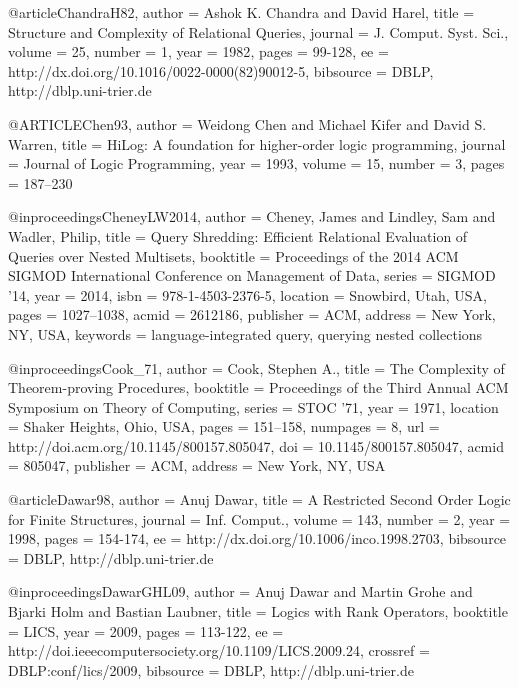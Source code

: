 \documentclass{article}
\begin{document}
@article{ChandraH82,
  author    = {Ashok K. Chandra and
               David Harel},
  title     = {Structure and Complexity of Relational Queries},
  journal   = {J. Comput. Syst. Sci.},
  volume    = {25},
  number    = {1},
  year      = {1982},
  pages     = {99-128},
  ee        = {http://dx.doi.org/10.1016/0022-0000(82)90012-5},
  bibsource = {DBLP, http://dblp.uni-trier.de}
}

@ARTICLE{Chen93,
    author = {Weidong Chen and Michael Kifer and David S. Warren},
    title = {HiLog: A foundation for higher-order logic programming},
    journal = {Journal of Logic Programming},
    year = {1993},
    volume = {15},
    number = {3},
    pages = {187--230}
}


@inproceedings{CheneyLW2014,
 author = {Cheney, James and Lindley, Sam and Wadler, Philip},
 title = {Query Shredding: Efficient Relational Evaluation of Queries over Nested Multisets},
 booktitle = {Proceedings of the 2014 ACM SIGMOD International Conference on Management of Data},
 series = {SIGMOD '14},
 year = {2014},
 isbn = {978-1-4503-2376-5},
 location = {Snowbird, Utah, USA},
 pages = {1027--1038},
 acmid = {2612186},
 publisher = {ACM},
 address = {New York, NY, USA},
 keywords = {language-integrated query, querying nested collections}
} 

@inproceedings{Cook_71,
 author = {Cook, Stephen A.},
 title = {The Complexity of Theorem-proving Procedures},
 booktitle = {Proceedings of the Third Annual ACM Symposium on Theory of Computing},
 series = {STOC '71},
 year = {1971},
 location = {Shaker Heights, Ohio, USA},
 pages = {151--158},
 numpages = {8},
 url = {http://doi.acm.org/10.1145/800157.805047},
 doi = {10.1145/800157.805047},
 acmid = {805047},
 publisher = {ACM},
 address = {New York, NY, USA}
} 

@article{Dawar98,
  author    = {Anuj Dawar},
  title     = {A Restricted Second Order Logic for Finite Structures},
  journal   = {Inf. Comput.},
  volume    = {143},
  number    = {2},
  year      = {1998},
  pages     = {154-174},
  ee        = {http://dx.doi.org/10.1006/inco.1998.2703},
  bibsource = {DBLP, http://dblp.uni-trier.de}
}

@inproceedings{DawarGHL09,
  author    = {Anuj Dawar and
               Martin Grohe and
               Bjarki Holm and
               Bastian Laubner},
  title     = {Logics with Rank Operators},
  booktitle = {LICS},
  year      = {2009},
  pages     = {113-122},
  ee        = {http://doi.ieeecomputersociety.org/10.1109/LICS.2009.24},
  crossref  = {DBLP:conf/lics/2009},
  bibsource = {DBLP, http://dblp.uni-trier.de}
}
\end{document}
